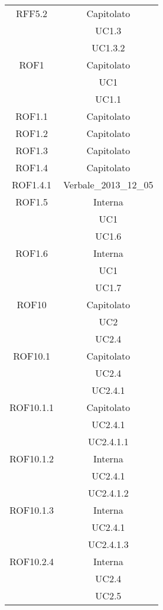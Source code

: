 \begin{longtable}{|c|c|}
\midrule
RFF5.2
& Capitolato\\
& UC1.3\\
& UC1.3.2\\

\midrule
ROF1
& Capitolato\\
& UC1\\
& UC1.1\\

\midrule
ROF1.1
& Capitolato\\

\midrule
ROF1.2
& Capitolato\\

\midrule
ROF1.3
& Capitolato\\

\midrule
ROF1.4
& Capitolato\\

\midrule
ROF1.4.1
& Verbale\_2013\_12\_05\\

\midrule
ROF1.5
& Interna\\
& UC1\\
& UC1.6\\

\midrule
ROF1.6
& Interna\\
& UC1\\
& UC1.7\\

\midrule
ROF10
& Capitolato\\
& UC2\\
& UC2.4\\

\midrule
ROF10.1
& Capitolato\\
& UC2.4\\
& UC2.4.1\\

\midrule
ROF10.1.1
& Capitolato\\
& UC2.4.1\\
& UC2.4.1.1\\

\midrule
ROF10.1.2
& Interna\\
& UC2.4.1\\
& UC2.4.1.2\\

\midrule
ROF10.1.3
& Interna\\
& UC2.4.1\\
& UC2.4.1.3\\

\midrule
ROF10.2.4
& Interna\\
& UC2.4\\
& UC2.5\\


\end{longtable}
